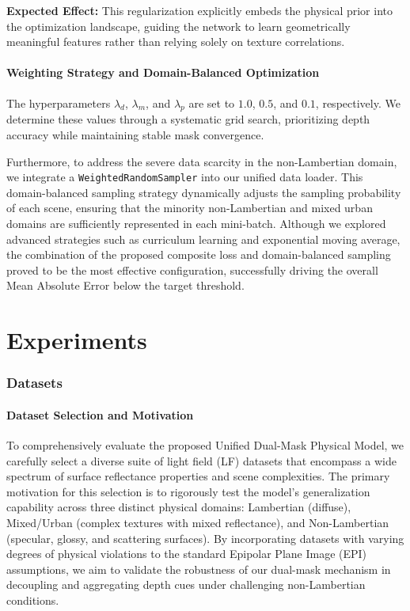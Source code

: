 \documentclass[lettersize,journal]{IEEEtran}
\begin{document}
\textbf{Expected Effect:} This regularization explicitly embeds the physical prior into the optimization landscape, guiding the network to learn geometrically meaningful features rather than relying solely on texture correlations.

\paragraph{Weighting Strategy and Domain-Balanced Optimization}
The hyperparameters $\lambda_{d}$, $\lambda_{m}$, and $\lambda_{p}$ are set to $1.0$, $0.5$, and $0.1$, respectively. We determine these values through a systematic grid search, prioritizing depth accuracy while maintaining stable mask convergence. 

Furthermore, to address the severe data scarcity in the non-Lambertian domain, we integrate a \texttt{WeightedRandomSampler} into our unified data loader. This domain-balanced sampling strategy dynamically adjusts the sampling probability of each scene, ensuring that the minority non-Lambertian and mixed urban domains are sufficiently represented in each mini-batch. Although we explored advanced strategies such as curriculum learning and exponential moving average, the combination of the proposed composite loss and domain-balanced sampling proved to be the most effective configuration, successfully driving the overall Mean Absolute Error below the target threshold.

\section{Experiments}

\subsubsection{Datasets}

\paragraph{Dataset Selection and Motivation}
To comprehensively evaluate the proposed Unified Dual-Mask Physical Model, we carefully select a diverse suite of light field (LF) datasets that encompass a wide spectrum of surface reflectance properties and scene complexities. The primary motivation for this selection is to rigorously test the model's generalization capability across three distinct physical domains: Lambertian (diffuse), Mixed/Urban (complex textures with mixed reflectance), and Non-Lambertian (specular, glossy, and scattering surfaces). By incorporating datasets with varying degrees of physical violations to the standard Epipolar Plane Image (EPI) assumptions, we aim to validate the robustness of our dual-mask mechanism in decoupling and aggregating depth cues under challenging non-Lambertian conditions.
\end{document}
